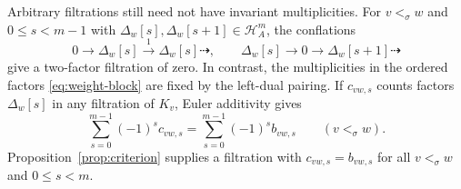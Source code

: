 \documentclass[11pt,a4paper]{article}
\renewcommand{\H}{\mathcal H}
\newcommand{\std}{\Delta}
\theoremstyle{plain}
\theoremstyle{definition}
\numberwithin{equation}{section}
\begin{document}
Arbitrary filtrations still need not have invariant multiplicities.
For $v<_\sigma w$ and $0\leq s<m-1$ with
$\std_w[s],\std_w[s+1]\in\H_A^m$, the conflations
\begin{equation}\label{eq:cancellation}
 0\longrightarrow\std_w[s]\xrightarrow{1}\std_w[s]\dashrightarrow,
 \qquad
 \std_w[s]\longrightarrow0\longrightarrow\std_w[s+1]\dashrightarrow
\end{equation}
give a two-factor filtration of zero.
In contrast, the multiplicities in the ordered factors
\eqref{eq:weight-block} are fixed by the left-dual pairing.
If $c_{vw,s}$ counts factors $\std_w[s]$ in any filtration of $K_v$,
Euler additivity gives
\begin{equation}\label{eq:signed-multiplicity}
 \sum_{s=0}^{m-1}(-1)^s c_{vw,s}
 =\sum_{s=0}^{m-1}(-1)^s b_{vw,s}
 \qquad(v<_\sigma w).
\end{equation}
Proposition~\ref{prop:criterion} supplies a filtration with
$c_{vw,s}=b_{vw,s}$ for all $v<_\sigma w$ and $0\leq s<m$.
\end{document}
